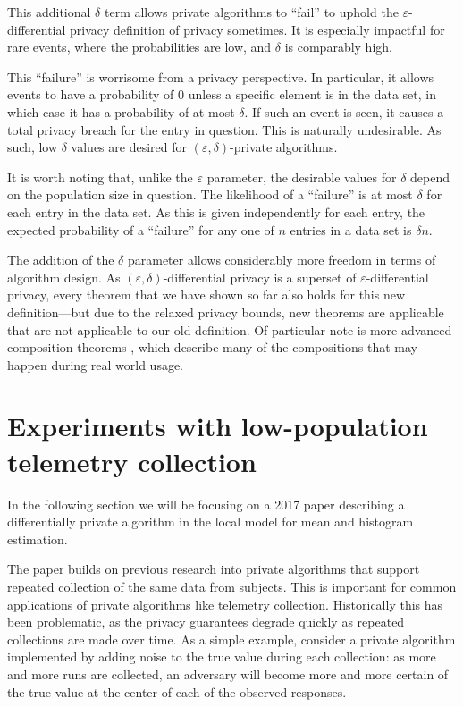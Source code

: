\documentclass[12pt]{article}
\renewcommand{\epsilon}{\varepsilon}
\begin{document}
This additional $\delta$ term allows private algorithms to ``fail'' to uphold the $\epsilon$-differential privacy definition of privacy sometimes. It is especially impactful for rare events, where the probabilities are low, and $\delta$ is comparably high.

This ``failure'' is worrisome from a privacy perspective. In particular, it allows events to have a probability of 0 unless a specific element is in the data set, in which case it has a probability of at most $\delta$. If such an event is seen, it causes a total privacy breach for the entry in question. This is naturally undesirable. As such, low $\delta$ values are desired for $(\epsilon,\delta)$-private algorithms.

It is worth noting that, unlike the $\epsilon$ parameter, the desirable values for $\delta$ depend on the population size in question. The likelihood of a ``failure'' is at most $\delta$ for each entry in the data set. As this is given independently for each entry, the expected probability of a ``failure'' for any one of $n$ entries in a data set is $\delta n$.\bigskip

The addition of the $\delta$ parameter allows considerably more freedom in terms of algorithm design. As $(\epsilon,\delta)$-differential privacy is a superset of $\epsilon$-differential privacy, every theorem that we have shown so far also holds for this new definition---but due to the relaxed privacy bounds, new theorems are applicable that are not applicable to our old definition. Of particular note is more advanced composition theorems \cite[Sec.~3.5.2]{dwork_privacybook}, which describe many of the compositions that may happen during real world usage.

\newpage
\section{Experiments with low-population telemetry collection \label{sec:telemetry}}

In the following section we will be focusing on a 2017 paper \cite{microsoft_telemetry} describing a differentially private algorithm in the local model for mean and histogram estimation.

The paper builds on previous research \cite{google_rappor} into private algorithms that support repeated collection of the same data from subjects. This is important for common applications of private algorithms like telemetry collection. Historically this has been problematic, as the privacy guarantees degrade quickly as repeated collections are made over time. As a simple example, consider a private algorithm implemented by adding noise to the true value during each collection: as more and more runs are collected, an adversary will become more and more certain of the true value at the center of each of the observed responses.
\end{document}
